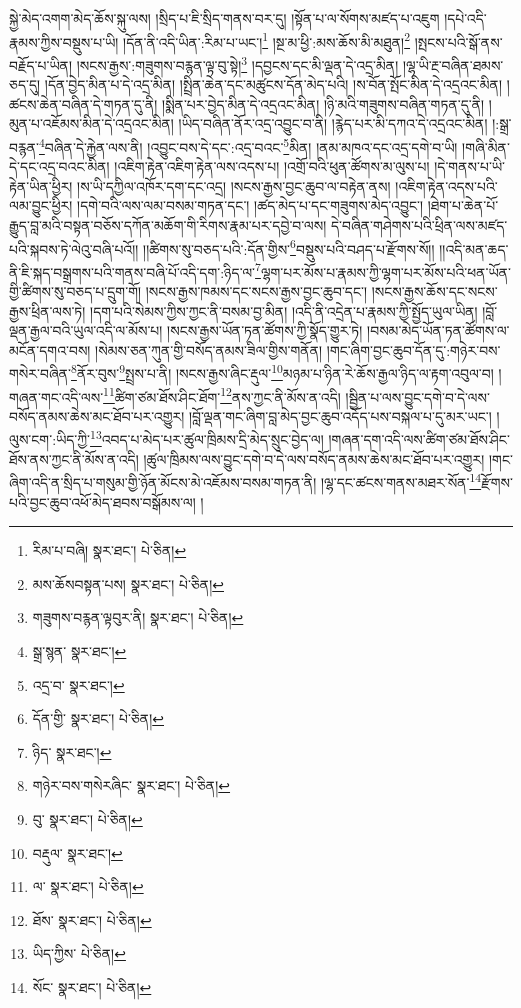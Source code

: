 སྐྱེ་མེད་འགག་མེད་ཆོས་སྐུ་ལས། །སྲིད་པ་ཇི་སྲིད་གནས་བར་དུ། །སྟོན་པ་ལ་སོགས་མཛད་པ་འཇུག །དཔེ་འདི་རྣམས་ཀྱིས་བསྡུས་པ་ཡི། །དོན་ནི་འདི་ཡིན་:རིམ་པ་ཡང་།\footnote{རིམ་པ་བཞི།  སྣར་ཐང་།  པེ་ཅིན། } །སྔ་མ་ཕྱི་:མས་ཆོས་མི་མཐུན།\footnote{མས་ཆོསབསྟན་པས།  སྣར་ཐང་།  པེ་ཅིན། } །སྤངས་པའི་སྒོ་ནས་བརྗོད་པ་ཡིན། །སངས་རྒྱས་:གཟུགས་བརྙན་ལྟ་བུ་སྟེ།\footnote{གཟུགས་བརྙན་ལྟབུར་ནི།  སྣར་ཐང་།  པེ་ཅིན། } །དབྱངས་དང་མི་ལྡན་དེ་འདྲ་མིན། །ལྷ་ཡི་རྔ་བཞིན་ཐམས་ཅད་དུ། །དོན་བྱེད་མིན་པ་དེ་འདྲ་མིན། །སྤྲིན་ཆེན་དང་མཚུངས་དོན་མེད་པའི། །ས་བོན་སྤོང་མིན་དེ་འདྲའང་མིན། །ཚངས་ཆེན་བཞིན་དེ་གཏན་དུ་ནི། །སྨིན་པར་བྱེད་མིན་དེ་འདྲའང་མིན། །ཉི་མའི་གཟུགས་བཞིན་གཏན་དུ་ནི། །མུན་པ་འཇོམས་མིན་དེ་འདྲའང་མིན། །ཡིད་བཞིན་ནོར་འདྲ་འབྱུང་བ་ནི། །རྙེད་པར་མི་དཀའ་དེ་འདྲའང་མིན། །:སྒྲ་བརྙན་\footnote{སྒྲ་སྙན་  སྣར་ཐང་། }བཞིན་དེ་རྐྱེན་ལས་ནི། །འབྱུང་བས་དེ་དང་:འདྲ་བའང་\footnote{འདྲ་བ་  སྣར་ཐང་། }མིན། །ནམ་མཁའ་དང་འདྲ་དགེ་བ་ཡི། །གཞི་མིན་དེ་དང་འདྲ་བའང་མིན། །འཇིག་རྟེན་འཇིག་རྟེན་ལས་འདས་པ། །འགྲོ་བའི་ཕུན་ཚོགས་མ་ལུས་པ། །དེ་གནས་པ་ཡི་རྟེན་ཡིན་ཕྱིར། །ས་ཡི་དཀྱིལ་འཁོར་དག་དང་འདྲ། །སངས་རྒྱས་བྱང་ཆུབ་ལ་བརྟེན་ནས། །འཇིག་རྟེན་འདས་པའི་ལམ་བྱུང་ཕྱིར། །དགེ་བའི་ལས་ལམ་བསམ་གཏན་དང་། །ཚད་མེད་པ་དང་གཟུགས་མེད་འབྱུང་། །ཐེག་པ་ཆེན་པོ་རྒྱུད་བླ་མའི་བསྟན་བཅོས་དཀོན་མཆོག་གི་རིགས་རྣམ་པར་དབྱེ་བ་ལས། དེ་བཞིན་གཤེགས་པའི་ཕྲིན་ལས་མཛད་པའི་སྐབས་ཏེ་ལེའུ་བཞི་པའོ།། །།ཚིགས་སུ་བཅད་པའི་:དོན་གྱིས་\footnote{དོན་གྱི་  སྣར་ཐང་།  པེ་ཅིན། }བསྡུས་པའི་བཤད་པ་རྫོགས་སོ།། །།འདི་མན་ཆད་ནི་ཇི་སྐད་བསྒྲགས་པའི་གནས་བཞི་པོ་འདི་དག་:ཉིད་ལ་\footnote{ཉིད་  སྣར་ཐང་། }ལྷག་པར་མོས་པ་རྣམས་ཀྱི་ལྷག་པར་མོས་པའི་ཕན་ཡོན་གྱི་ཚིགས་སུ་བཅད་པ་དྲུག་གོ། །སངས་རྒྱས་ཁམས་དང་སངས་རྒྱས་བྱང་ཆུབ་དང་། །སངས་རྒྱས་ཆོས་དང་སངས་རྒྱས་ཕྲིན་ལས་ཏེ། །དག་པའི་སེམས་ཀྱིས་ཀྱང་ནི་བསམ་བྱ་མིན། །འདི་ནི་འདྲེན་པ་རྣམས་ཀྱི་སྤྱོད་ཡུལ་ཡིན། །བློ་ལྡན་རྒྱལ་བའི་ཡུལ་འདི་ལ་མོས་པ། །སངས་རྒྱས་ཡོན་ཏན་ཚོགས་ཀྱི་སྣོད་གྱུར་ཏེ། །བསམ་མེད་ཡོན་ཏན་ཚོགས་ལ་མངོན་དགའ་བས། །སེམས་ཅན་ཀུན་གྱི་བསོད་ནམས་ཟིལ་གྱིས་གནོན། །གང་ཞིག་བྱང་ཆུབ་དོན་དུ་:གཉེར་བས་གསེར་བཞིན་\footnote{གཉེར་བས་གསེརཞིང་  སྣར་ཐང་།  པེ་ཅིན། }ནོར་བུས་\footnote{བུ་  སྣར་ཐང་།  པེ་ཅིན། }སྤྲས་པ་ནི། །སངས་རྒྱས་ཞིང་རྡུལ་\footnote{བརྡུལ་  སྣར་ཐང་། }མཉམ་པ་ཉིན་རེ་ཆོས་རྒྱལ་ཉིད་ལ་རྟག་འབུལ་བ། །གཞན་གང་འདི་ལས་\footnote{ལ་  སྣར་ཐང་།  པེ་ཅིན། }ཚིག་ཙམ་ཐོས་ཤིང་ཐོག་\footnote{ཐོས་  སྣར་ཐང་།  པེ་ཅིན། }ནས་ཀྱང་ནི་མོས་ན་འདི། །སྦྱིན་པ་ལས་བྱུང་དགེ་བ་དེ་ལས་བསོད་ནམས་ཆེས་མང་ཐོབ་པར་འགྱུར། །བློ་ལྡན་གང་ཞིག་བླ་མེད་བྱང་ཆུབ་འདོད་པས་བསྐལ་པ་དུ་མར་ཡང་། །ལུས་ངག་:ཡིད་ཀྱི་\footnote{ཡིད་ཀྱིས་  པེ་ཅིན། }འབད་པ་མེད་པར་ཚུལ་ཁྲིམས་དྲི་མེད་སྲུང་བྱེད་ལ། །གཞན་དག་འདི་ལས་ཚིག་ཙམ་ཐོས་ཤིང་ཐོས་ནས་ཀྱང་ནི་མོས་ན་འདི། །ཚུལ་ཁྲིམས་ལས་བྱུང་དགེ་བ་དེ་ལས་བསོད་ནམས་ཆེས་མང་ཐོབ་པར་འགྱུར། །གང་ཞིག་འདི་ན་སྲིད་པ་གསུམ་གྱི་ཉོན་མོངས་མེ་འཇོམས་བསམ་གཏན་ནི། །ལྷ་དང་ཚངས་གནས་མཐར་སོན་\footnote{སོང་  སྣར་ཐང་།  པེ་ཅིན། }རྫོགས་པའི་བྱང་ཆུབ་འཕོ་མེད་ཐབས་བསྒོམས་ལ། །

